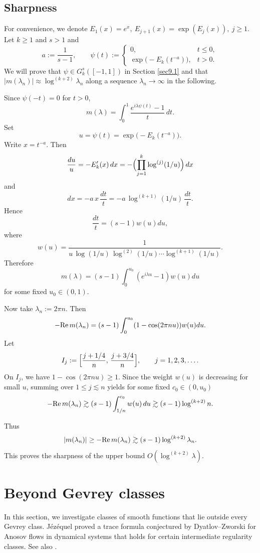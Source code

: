 \documentclass[11pt]{amsart}
\newcommand{\la}{\lambda}
\renewcommand{\Re}{ {\rm Re}\,}
\newcommand{\ls}{\lesssim}
\newcommand{\gs}{\gtrsim}
\newcommand{\1}{{\rm 1\hspace*{-0.4ex}%
			\rule{0.1ex}{1.52ex}\hspace*{0.2ex}}}
\numberwithin{equation}{section}
\begin{document}
\subsection{Sharpness}\label{6harp}
For convenience, we denote $E_1(x)=e^x,\ E_{j+1}(x)=\exp(E_j(x)),\ j\ge1$. Let \(k\ge 1\) and \(s>1\) and
\[
a:=\frac1{s-1},
\qquad
\psi(t):=
\begin{cases}
	0,& t\le 0,\\[1mm]
	\exp\!\bigl(-E_k(t^{-a})\bigr),& t>0.
\end{cases}
\]
We will prove that \(\psi\in G_k^s([-1,1])\) in Section \ref{sec9.1} and that $|m(\lambda_n)| \approx \log^{(k+2)} \lambda_n$ along a sequence $\lambda_n\to\infty$ in the following.

Since \(\psi(-t)=0\) for \(t>0\),
\[
m(\lambda)=\int_0^1 \frac{e^{i\lambda \psi(t)}-1}{t}\,dt.
\]
Set
\[
u=\psi(t)=\exp\!\bigl(-E_k(t^{-a})\bigr).
\]
Write \(x=t^{-a}\). Then
\[
\frac{du}{u}=-E_k'(x)\,dx
=
-\Bigl(\prod_{j=1}^k \log^{(j)}(1/u)\Bigr)\,dx
\]
and
\[
dx=-a\,x\,\frac{dt}{t}
=
-a\,\log^{(k+1)}(1/u)\,\frac{dt}{t}.
\]
Hence
\[
\frac{dt}{t}
=
(s-1)w(u)du,
\]
where $$w(u)=
\frac1{u\,\log(1/u)\,\log^{(2)}(1/u)\cdots \log^{(k+1)}(1/u)}.$$
Therefore
\[
m(\lambda)
=
(s-1)\int_0^{u_0}
(e^{i\lambda u}-1)w(u)
du
\]
for some fixed \(u_0\in(0,1)\).

Now take \(\lambda_n:=2\pi n\). Then
\[
-\Re m(\lambda_n)
=
(s-1)\int_0^{u_0}
(1-\cos(2\pi n u))w(u)du.
\]
Let
\[
I_j:=\Bigl[\frac{j+1/4}{n},\,\frac{j+3/4}{n}\Bigr],\qquad j=1,2,3,\dots.
\]
On \(I_j\), we have \(1-\cos(2\pi n u)\ge 1\). Since the weight $w(u)$ is decreasing for small \(u\), summing over \(1\le j\ls n\) yields for some fixed \(c_0\in(0,u_0)\)
\[
-\Re m(\lambda_n)
\gtrsim (s-1)
\int_{1/n}^{c_0} w(u)\,du\gs (s-1)\log^{(k+2)}n.
\]

Thus
\[
|m(\lambda_n)|
\ge -\Re m(\lambda_n)
\gtrsim (s-1)\log^{(k+2)}\lambda_n.
\]
This proves the sharpness of the upper bound $O(\log^{(k+2)}\la)$.

\section{Beyond Gevrey classes}\label{sec7}
In this section, we investigate classes of smooth functions that lie outside every Gevrey class. Jézéquel \cite{jez} proved a trace formula conjectured by Dyatlov--Zworski \cite{dz2016} for Anosov flows in dynamical systems that holds for certain intermediate regularity classes. See also \cite{CL,ptt2015,ptt2018}.
\end{document}
